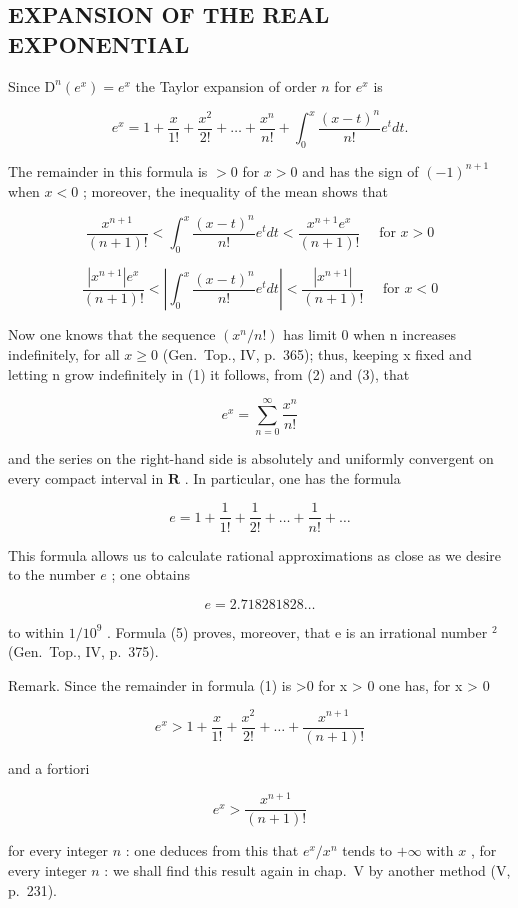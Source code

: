 \subsection{EXPANSION OF THE REAL EXPONENTIAL}

Since \(\mathrm{D}^n (e^x) = e^x\) the Taylor expansion of order \(n\) for \(e^x\) is

\[
e ^ {x} = 1 + \frac {x}{1 !} + \frac {x ^ {2}}{2 !} + \dots + \frac {x ^ {n}}{n !} + \int_ {0} ^ {x} \frac {(x - t) ^ {n}}{n !} e ^ {t} d t.\tag{1}
\]

The remainder in this formula is \(>0\) for \(x > 0\) and has the sign of \((-1)^{n + 1}\) when \(x < 0\) ; moreover, the inequality of the mean shows that

\[
\frac {x ^ {n + 1}}{(n + 1) !} <   \int_ {0} ^ {x} \frac {(x - t) ^ {n}}{n !} e ^ {t} d t <   \frac {x ^ {n + 1} e ^ {x}}{(n + 1) !} \quad \text { for } x > 0\tag{2}
\]

\[
\frac {\left| x ^ {n + 1} \right| e ^ {x}}{(n + 1) !} <   \left| \int_ {0} ^ {x} \frac {(x - t) ^ {n}}{n !} e ^ {t} d t \right| <   \frac {\left| x ^ {n + 1} \right|}{(n + 1) !} \quad \text { for } x <   0\tag{3}
\]

Now one knows that the sequence \((x^{n}/n!)\) has limit 0 when n increases indefinitely, for all \(x \geqslant 0\) (Gen.~Top., IV, p.~365); thus, keeping x fixed and letting n grow indefinitely in (1) it follows, from (2) and (3), that

\[
e ^ {x} = \sum_ {n = 0} ^ {\infty} \frac {x ^ {n}}{n !}\tag{4}
\]

and the series on the right-hand side is absolutely and uniformly convergent on every compact interval in \(\mathbf{R}\) . In particular, one has the formula

\[
e = 1 + \frac {1}{1 !} + \frac {1}{2 !} + \dots + \frac {1}{n !} + \dots\tag{5}
\]

This formula allows us to calculate rational approximations as close as we desire to the number \(e\) ; one obtains

\[
e = 2. 7 1 8   2 8 1   8 2 8 \dots
\]

to within \(1/10^{9}\) . Formula (5) proves, moreover, that e is an irrational number \(^{2}\) (Gen.~Top., IV, p.~375).

Remark. Since the remainder in formula (1) is \textgreater0 for x \textgreater{} 0 one has, for x \textgreater{} 0

\[
e ^ {x} > 1 + \frac {x}{1 !} + \frac {x ^ {2}}{2 !} + \dots + \frac {x ^ {n + 1}}{(n + 1) !}
\]

and a fortiori

\[
e ^ {x} > \frac {x ^ {n + 1}}{(n + 1) !}
\]

for every integer \(n\) : one deduces from this that \(e^x / x^n\) tends to \(+\infty\) with \(x\) , for every integer \(n\) : we shall find this result again in chap.~V by another method (V, p.~231).

